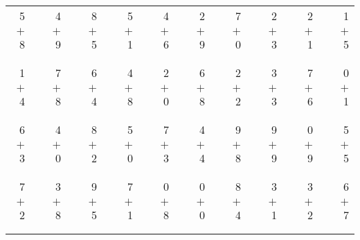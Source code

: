 \documentclass[12pt, letterpaper]{article}
\begin{document}
\begin{tabular}{rrrrrrrrrrrrrrrrrrr}
5 & & 4 & & 8 & & 5 & & 4 & & 2 & & 7 & & 2 & & 2 & & 1\\
$+$ 8 & & $+$ 9 & & $+$ 5 & & $+$ 1 & & $+$ 6 & & $+$ 9 & & $+$ 0 & & $+$ 3 & & $+$ 1 & & $+$ 5\\
\cline{1-1} \cline{3-3} \cline{5-5} \cline{7-7} \cline{9-9} \cline{11-11} \cline{13-13} \cline{15-15} \cline{17-17} \cline{19-19} \\ \\
1 & & 7 & & 6 & & 4 & & 2 & & 6 & & 2 & & 3 & & 7 & & 0\\
$+$ 4 & & $+$ 8 & & $+$ 4 & & $+$ 8 & & $+$ 0 & & $+$ 8 & & $+$ 2 & & $+$ 3 & & $+$ 6 & & $+$ 1\\
\cline{1-1} \cline{3-3} \cline{5-5} \cline{7-7} \cline{9-9} \cline{11-11} \cline{13-13} \cline{15-15} \cline{17-17} \cline{19-19} \\ \\
6 & & 4 & & 8 & & 5 & & 7 & & 4 & & 9 & & 9 & & 0 & & 5\\
$+$ 3 & & $+$ 0 & & $+$ 2 & & $+$ 0 & & $+$ 3 & & $+$ 4 & & $+$ 8 & & $+$ 9 & & $+$ 9 & & $+$ 5\\
\cline{1-1} \cline{3-3} \cline{5-5} \cline{7-7} \cline{9-9} \cline{11-11} \cline{13-13} \cline{15-15} \cline{17-17} \cline{19-19} \\ \\
7 & & 3 & & 9 & & 7 & & 0 & & 0 & & 8 & & 3 & & 3 & & 6\\
$+$ 2 & & $+$ 8 & & $+$ 5 & & $+$ 1 & & $+$ 8 & & $+$ 0 & & $+$ 4 & & $+$ 1 & & $+$ 2 & & $+$ 7\\
\cline{1-1} \cline{3-3} \cline{5-5} \cline{7-7} \cline{9-9} \cline{11-11} \cline{13-13} \cline{15-15} \cline{17-17} \cline{19-19} \\ \\
\end{tabular}
\newpage
\end{document}
